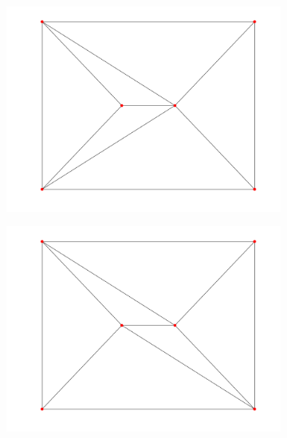 \begin{figure}[ht]
    \centering
    \begin{subfigure}[b]{0.2\textwidth}
        \centering
        \includegraphics[width=\textwidth]{report/Images/Theory/triangulation/triangulation_delaunay.png}
        \label{fig:triangulation-delaunay1}
    \end{subfigure}
    \hfill
    \begin{subfigure}[b]{0.2\textwidth}
        \centering
        \includegraphics[width=\textwidth]{report/Images/Theory/triangulation/triangulation_delaunay3.png}
        \label{fig:triangulation-delaunay3}
    \end{subfigure}
    \hfill
    \begin{subfigure}[b]{0.2\textwidth}

\end{subfigure}
\end{figure}
